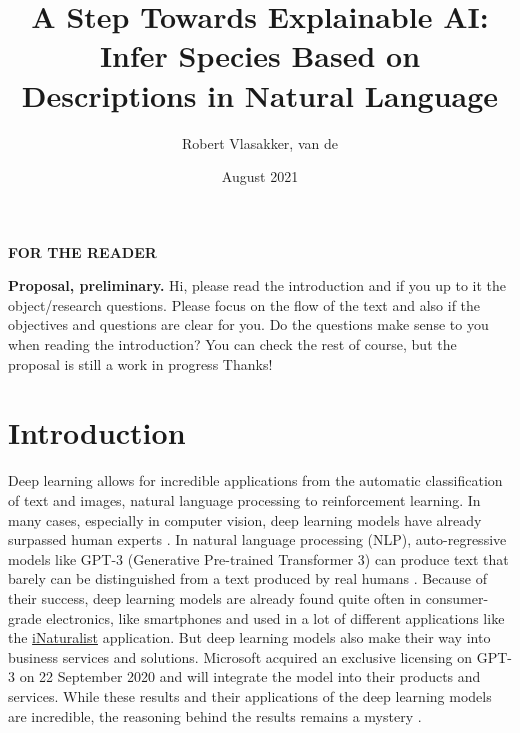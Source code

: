 \documentclass{article}
\title{A Step Towards Explainable AI: Infer Species Based on Descriptions in Natural Language}
\author{Robert Vlasakker, van de}
\date{August 2021}
\begin{document}
\graphicspath{ {./figures/} }

\maketitle
{\Large \textbf{FOR THE READER}\par}
\noindent
\textbf{Proposal, preliminary.}
Hi, please read the introduction and if you up to it the object/research questions.
Please focus on the flow of the text and also if the objectives and questions are clear for you. Do the questions make sense to you when reading the introduction?
\noindent
You can check the rest of course, but the proposal is still a work in progress
\noindent
Thanks!

\newpage

\section{Introduction}
Deep learning allows for incredible applications from the automatic classification of text and images, natural language processing to reinforcement learning.
In many cases, especially in computer vision, deep learning models have already surpassed human experts \cite{he_delving_2015}.
In natural language processing (NLP), auto-regressive models like GPT-3 (Generative Pre-trained Transformer 3) can produce text that barely can be distinguished from a text produced by real humans \cite{brown_language_2020}.
Because of their success, deep learning models are already found quite often in consumer-grade electronics, like smartphones and used in a lot of different applications like the \href{https://www.inaturalist.org/}{iNaturalist} application.
But deep learning models also make their way into business services and solutions.
Microsoft acquired an exclusive licensing on GPT-3 on 22 September 2020 and will integrate the model into their products and services.
While these results and their applications of the deep learning models are incredible, the reasoning behind the results remains a mystery \cite{li_interpretable_2021, losch_interpretability_2019}.
\end{document}
